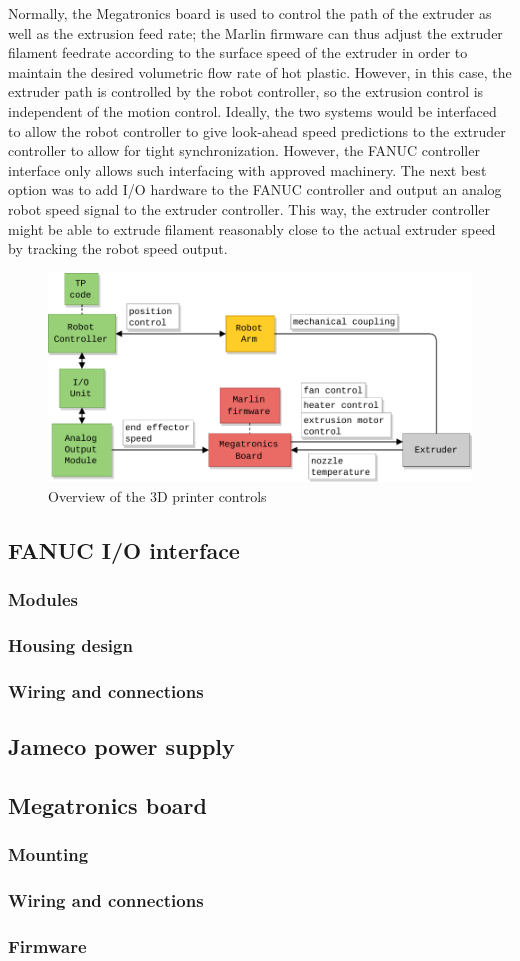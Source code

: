 Normally, the Megatronics board is used to control the path of the extruder as well as the extrusion feed rate; the Marlin firmware can thus adjust the extruder filament feedrate according to the surface speed of the extruder in order to maintain the desired volumetric flow rate of hot plastic. However, in this case, the extruder path is controlled by the robot controller, so the extrusion control is independent of the motion control. Ideally, the two systems would be interfaced to allow the robot controller to give look-ahead speed predictions to the extruder controller to allow for tight synchronization. However, the FANUC controller interface only allows such interfacing with approved machinery. The next best option was to add I/O hardware to the FANUC controller and output an analog robot speed signal to the extruder controller. This way, the extruder controller might be able to extrude filament reasonably close to the actual extruder speed by tracking the robot speed output.

\begin{figure}
    \centering
    \includegraphics[width=.8\linewidth]{figures/diagrams/system overview}
    \caption{Overview of the 3D printer controls}
    \label{fig:sys-overview}
\end{figure}


\subsection{FANUC I/O interface}
    \subsubsection{Modules}
    \subsubsection{Housing design}
    \subsubsection{Wiring and connections}
\subsection{Jameco power supply}
\subsection{Megatronics board}
    \subsubsection{Mounting}
    \subsubsection{Wiring and connections}
    \subsubsection{Firmware}

